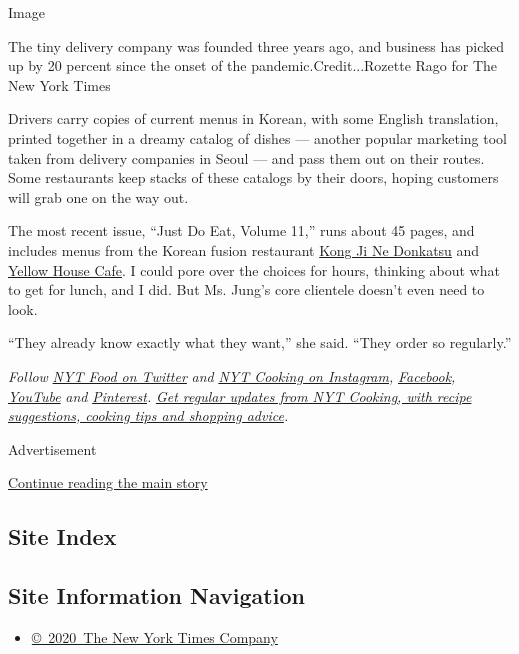 Image

The tiny delivery company was founded three years ago, and business has
picked up by 20 percent since the onset of the pandemic.Credit...Rozette
Rago for The New York Times

Drivers carry copies of current menus in Korean, with some English
translation, printed together in a dreamy catalog of dishes --- another
popular marketing tool taken from delivery companies in Seoul --- and
pass them out on their routes. Some restaurants keep stacks of these
catalogs by their doors, hoping customers will grab one on the way out.

The most recent issue, ``Just Do Eat, Volume 11,'' runs about 45 pages,
and includes menus from the Korean fusion restaurant
\href{http://www.kongjinedonkatsu.com/}{Kong Ji Ne Donkatsu} and
\href{http://www.theyellowhousecafe.com/}{Yellow House Cafe}. I could
pore over the choices for hours, thinking about what to get for lunch,
and I did. But Ms. Jung's core clientele doesn't even need to look.

``They already know exactly what they want,'' she said. ``They order so
regularly.''

\emph{Follow} \href{https://twitter.com/nytfood}{\emph{NYT Food on
Twitter}} \emph{and}
\href{https://www.instagram.com/nytcooking/}{\emph{NYT Cooking on
Instagram}}\emph{,}
\href{https://www.facebookcorewwwi.onion/nytcooking/}{\emph{Facebook}}\emph{,}
\href{https://www.youtube.com/nytcooking}{\emph{YouTube}} \emph{and}
\href{https://www.pinterest.com/nytcooking/}{\emph{Pinterest}}\emph{.}
\href{https://www.nytimes3xbfgragh.onion/newsletters/cooking}{\emph{Get
regular updates from NYT Cooking, with recipe suggestions, cooking tips
and shopping advice}}\emph{.}

Advertisement

\protect\hyperlink{after-bottom}{Continue reading the main story}

\hypertarget{site-index}{%
\subsection{Site Index}\label{site-index}}

\hypertarget{site-information-navigation}{%
\subsection{Site Information
Navigation}\label{site-information-navigation}}

\begin{itemize}
\tightlist
\item
  \href{https://help.nytimes3xbfgragh.onion/hc/en-us/articles/115014792127-Copyright-notice}{©~2020~The
  New York Times Company}
\end{itemize}

